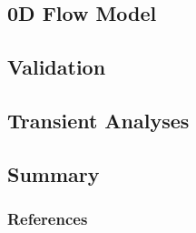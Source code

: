 \documentclass[9pt]{beamer}
\begin{document}
\subsection{0D Flow Model}

\subsection{Validation}


\subsection{Transient Analyses}



\subsection{Summary}



\begin{frame}[allowframebreaks]
  \frametitle{References}
  
  {\footnotesize  }
\end{frame}

\appendix









\end{document}
